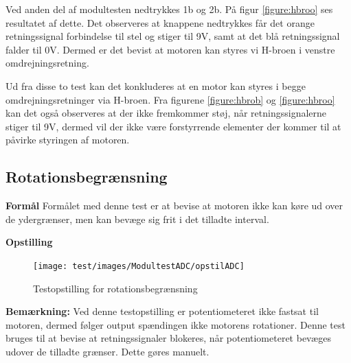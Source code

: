 Ved anden del af modultesten nedtrykkes 1b og 2b. På figur \ref{figure:hbroo} ses resultatet af dette. Det observeres at knappene nedtrykkes får det orange retningssignal forbindelse til stel og stiger til 9V, samt at det blå retningssignal falder til 0V. Dermed er det bevist at motoren kan styres vi H-broen i venstre omdrejningsretning. 

Ud fra disse to test kan det konkluderes at en motor kan styres i begge omdrejningsretninger via H-broen. Fra figurene \ref{figure:hbrob} og \ref{figure:hbroo} kan det også observeres at der ikke fremkommer støj, når retningssignalerne stiger til 9V, dermed vil der ikke være forstyrrende elementer der kommer til at påvirke styringen af motoren.


\subsection{Rotationsbegrænsning}
\noindent \textbf{Formål} \newline
\noindent Formålet med denne test er at bevise at motoren ikke kan køre ud over de ydergrænser, men kan bevæge sig frit i det tilladte interval. \newline

\noindent \textbf{Opstilling}
\begin{figure}[H]
	\centering
	\texttt{[image: test/images/ModultestADC/opstilADC]}
	\caption{Testopstilling for rotationsbegrænsning}
\end{figure}

\noindent \textbf{Bemærkning: }Ved denne testopstilling er potentiometeret ikke fastsat til motoren, dermed følger output spændingen ikke motorens rotationer. Denne test bruges til at bevise at retningssignaler blokeres, når potentiometeret bevæges udover de tilladte grænser. Dette gøres manuelt. 

